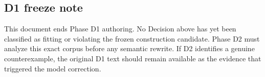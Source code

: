 \documentclass[
  10pt,
]{article}
\begin{document}
\subsection{D1 freeze note}\label{d1-freeze-note}

This document ends Phase D1 authoring. No Decision above has yet been
classified as fitting or violating the frozen construction candidate.
Phase D2 must analyze this exact corpus before any semantic rewrite. If
D2 identifies a genuine counterexample, the original D1 text should
remain available as the evidence that triggered the model correction.
\end{document}
